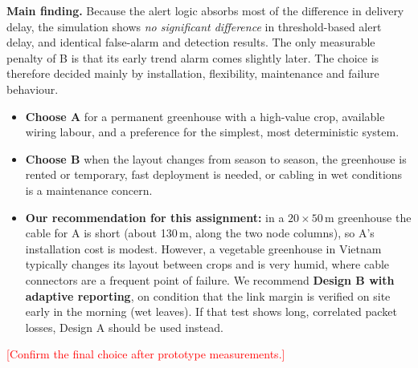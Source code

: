 \documentclass[11pt,a4paper]{report}
\newcommand{\todo}[1]{\textcolor{red}{[#1]}}
\begin{document}
\textbf{Main finding.} Because the alert logic absorbs most of the difference in delivery delay, the simulation shows \emph{no significant difference} in threshold-based alert delay, and identical false-alarm and detection results. The only measurable penalty of B is that its early trend alarm comes slightly later. The choice is therefore decided mainly by installation, flexibility, maintenance and failure behaviour.
\begin{itemize}
  \item \textbf{Choose A} for a permanent greenhouse with a high-value crop, available wiring labour, and a preference for the simplest, most deterministic system.
  \item \textbf{Choose B} when the layout changes from season to season, the greenhouse is rented or temporary, fast deployment is needed, or cabling in wet conditions is a maintenance concern.
  \item \textbf{Our recommendation for this assignment:} in a $20\times50$\,m greenhouse the cable for A is short (about 130\,m, along the two node columns), so A's installation cost is modest. However, a vegetable greenhouse in Vietnam typically changes its layout between crops and is very humid, where cable connectors are a frequent point of failure. We recommend \textbf{Design B with adaptive reporting}, on condition that the link margin is verified on site early in the morning (wet leaves). If that test shows long, correlated packet losses, Design A should be used instead.
\end{itemize}
\todo{Confirm the final choice after prototype measurements.}

\end{document}
